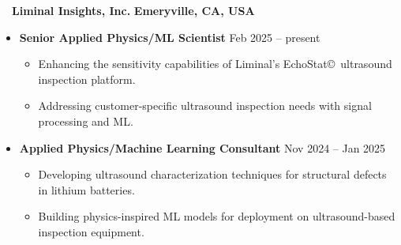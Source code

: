 ~~{\color{black}\textbf{Liminal Insights, Inc.} \hfill  \textbf{Emeryville, CA, USA}}\par
\begin{itemize}
    \item
    \textbf{Senior Applied Physics/ML Scientist}
    \hfill  {Feb 2025 -- present} \par
        \begin{itemize}
            \item Enhancing the sensitivity capabilities of Liminal's EchoStat\copyright~ultrasound inspection platform. 
            \item Addressing customer-specific ultrasound inspection needs with signal processing and ML. 
        \end{itemize}
    \item
        \textbf{Applied Physics/Machine Learning Consultant}
        \hfill  {Nov 2024 -- Jan 2025} \par
        \begin{itemize}
            \item Developing ultrasound characterization techniques for structural defects in lithium batteries. 
            \item Building physics-inspired ML models for deployment on ultrasound-based inspection equipment.
        \end{itemize}
\end{itemize}